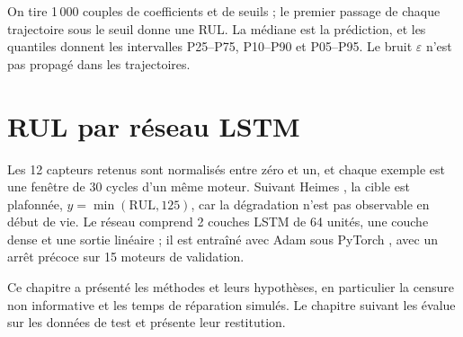 On tire 1\,000 couples de coefficients et de seuils ; le premier passage de chaque trajectoire sous le seuil donne une RUL. La médiane est la prédiction, et les quantiles donnent les intervalles P25–P75, P10–P90 et P05–P95. Le bruit $\varepsilon$ n'est pas propagé dans les trajectoires.

\section{RUL par réseau LSTM}\label{sec:lstm}

Les 12 capteurs retenus sont normalisés entre zéro et un, et chaque exemple est une fenêtre de 30 cycles d'un même moteur. Suivant Heimes \cite{heimes2008}, la cible est plafonnée, $y = \min(\mathrm{RUL}, 125)$, car la dégradation n'est pas observable en début de vie. Le réseau \cite{hochreiter1997,zheng2017} comprend 2 couches LSTM de 64 unités, une couche dense et une sortie linéaire ; il est entraîné avec Adam \cite{kingma2015} sous PyTorch \cite{paszke2019}, avec un arrêt précoce sur 15 moteurs de validation.

\chapconclusion

Ce chapitre a présenté les méthodes et leurs hypothèses, en particulier la censure non informative et les temps de réparation simulés. Le chapitre suivant les évalue sur les données de test et présente leur restitution.
